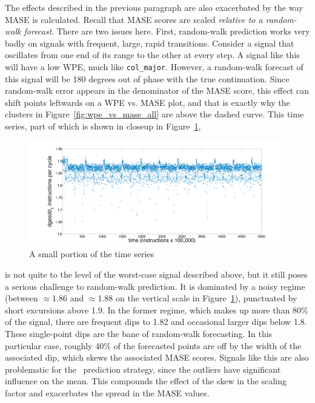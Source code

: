 The effects described in the previous paragraph are also exacerbated
by the way MASE is calculated.  Recall that MASE scores are scaled
\emph{relative to a random-walk forecast}.  There are two issues here.
First, random-walk prediction works very badly on signals with
frequent, large, rapid transitions.  Consider a signal that oscillates
from one end of its range to the other at every step.  A signal like
this will have a low WPE, much like {\tt col\_major}.  However, a
random-walk forecast of this signal will be 180 degrees out of phase
with the true continuation.  Since random-walk error appears in the
denominator of the MASE score, this effect can shift points leftwards
on a WPE vs. MASE plot, and that is exactly why the \svdone clusters
in Figure~\ref{fig:wpe_vs_mase_all} are above the dashed curve.  This
time series, part of which is shown in closeup in
Figure~\ref{fig:svdone-ts},
\begin{figure}[htbp]
  \centering
    \includegraphics[width=\columnwidth]{figs/svdonets2}
\caption{A small portion of the \svdone time series}\label{fig:svdone-ts}
\end{figure}
is not quite to the level of the worst-case signal described above,
but it still poses a serious challenge to random-walk prediction.  It
is dominated by a noisy regime (between $\approx$1.86 and
$\approx$1.88 on the vertical scale in Figure~\ref{fig:svdone-ts}),
punctuated by short excursions above 1.9.  In the former regime, which
makes up more than 80\% of the signal, there are frequent dips to 1.82
and occasional larger dips below 1.8.  These single-point dips are the
bane of random-walk forecasting.  In this particular case, roughly
40\% of the forecasted points are off by the width of the associated
dip, which skews the associated MASE scores.  Signals like this are
also problematic for the \naive ~prediction strategy, since the
outliers have significant influence on the mean.  This compounds the
effect of the skew in the scaling factor and exacerbates the spread in
the \svdone MASE values.


